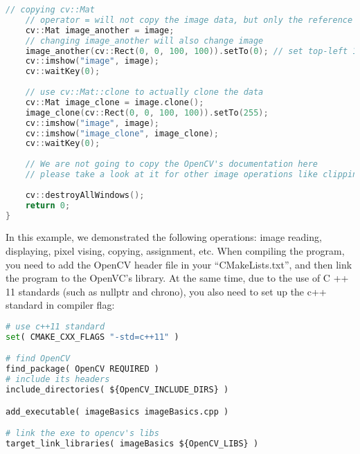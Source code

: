 \begin{lstlisting}[language=C++,caption=slambook/ch5/imageBasics/imageBasics.cpp]
    // copying cv::Mat
    // operator = will not copy the image data, but only the reference
    cv::Mat image_another = image;
    // changing image_another will also change image 
    image_another(cv::Rect(0, 0, 100, 100)).setTo(0); // set top-left 100*100 block to zero
    cv::imshow("image", image);
    cv::waitKey(0);
    
    // use cv::Mat::clone to actually clone the data
    cv::Mat image_clone = image.clone();
    image_clone(cv::Rect(0, 0, 100, 100)).setTo(255);
    cv::imshow("image", image);
    cv::imshow("image_clone", image_clone);
    cv::waitKey(0);
    
    // We are not going to copy the OpenCV's documentation here
    // please take a look at it for other image operations like clipping, rotating and scaling.
    
    cv::destroyAllWindows();
    return 0;
}
\end{lstlisting}

In this example, we demonstrated the following operations: image reading, displaying, pixel vising, copying, assignment, etc. When compiling the program, you need to add the OpenCV header file in your ``CMakeLists.txt'', and then link the program to the OpenVC's library. At the same time, due to the use of C ++ 11 standards (such as nullptr and chrono), you also need to set up the c++ standard in compiler flag:

\begin{lstlisting}[language=Python,caption=slambook/ch5/imageBasics/CMakeLists.txt]
# use c++11 standard
set( CMAKE_CXX_FLAGS "-std=c++11" )

# find OpenCV
find_package( OpenCV REQUIRED )
# include its headers
include_directories( ${OpenCV_INCLUDE_DIRS} )

add_executable( imageBasics imageBasics.cpp )

# link the exe to opencv's libs
target_link_libraries( imageBasics ${OpenCV_LIBS} )
\end{lstlisting}

